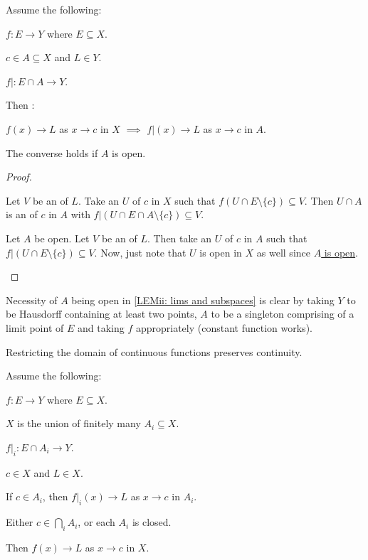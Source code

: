 	
	\begin{lem}\label{LEM: lims and subspaces}
		Assume the following:
		\begin{assmplist}
			\item $f\colon E\to Y$ where $E\subseteq X$.
			\item $c\in A\subseteq X$ and $L\in Y$.
			\item $f|\colon E\cap A\to Y$.
		\end{assmplist}
		Then \tfh:
		\begin{mylist}
			\item $f(x)\to L$ as $x\to c$ in $X$ $\implies$ $f|(x)\to L$ as $x\to c$ in $A$.
			
			\item\label{LEMii: lims and subspaces} The converse holds if $A$ is open.
		\end{mylist}
	\end{lem}
	
	\begin{proof}
		\begin{mylist}
			\item Let $V$ be an \onbd of $L$. Take an \onbd $U$ of $c$ in $X$ such that $f(U\cap E\setminus\{c\})\subseteq V$. Then $U\cap A$ is an \onbd of $c$ in $A$ with $f|(U\cap E\cap A\setminus\{c\})\subseteq V$.
			
			\item Let $A$ be open. Let $V$ be an \onbd of $L$. Then take an \onbd $U$ of $c$ in $A$ such that $f|(U\cap E\setminus\{c\})\subseteq V$. Now, just note that $U$ is open in $X$ as well since \uline{$A$ is open}.
			\qedhere
		\end{mylist}
	\end{proof}
	
	\begin{rmk}
		Necessity of $A$ being open in \ref{LEMii: lims and subspaces} is clear by taking $Y$ to be Hausdorff containing at least two points, $A$ to be a singleton comprising of a limit point of $E$ and taking $f$ appropriately (constant function works).
	\end{rmk}
	
	\begin{cor}
		Restricting the domain of continuous functions preserves continuity.
	\end{cor}
	
	
	\begin{prp}
		Assume the following:
		\begin{assmplist}
			\item $f\colon E\to Y$ where $E\subseteq X$.
			\item $X$ is the union of finitely many $A_i\subseteq X$.
			\item $f|_i : E\cap A_i\to Y$.
			\item $c\in X$ and $L\in X$.
			\item If $c\in A_i$, then $f|_i(x)\to L$ as $x\to c$ in $A_i$.
			\item Either $c\in\bigcap_i A_i$, or each $A_i$ is closed.
		\end{assmplist}
		Then $f(x)\to L$ as $x\to c$ in $X$.
	\end{prp}
	
